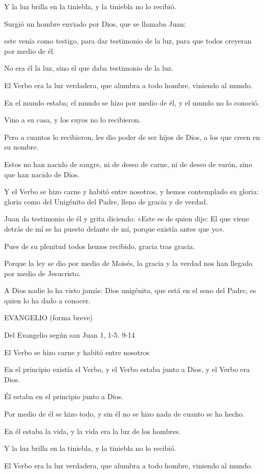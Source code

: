 \begin{body}
\begin{body}
Y la luz brilla en la tiniebla, y la tiniebla no lo recibió.

Surgió un hombre enviado por Dios, que se llamaba Juan:

este venía como testigo, para dar testimonio de la luz, para que todos
creyeran por medio de él.

No era él la luz, sino el que daba testimonio de la luz.

El Verbo era la luz verdadera, que alumbra a todo hombre, viniendo al
mundo.

En el mundo estaba; el mundo se hizo por medio de él, y el mundo no lo
conoció.

Vino a su casa, y los suyos no lo recibieron.

Pero a cuantos lo recibieron, les dio poder de ser hijos de Dios, a los
que creen en su nombre.

Estos no han nacido de sangre, ni de deseo de carne, ni de deseo de
varón, sino que han nacido de Dios.

Y el Verbo se hizo carne y habitó entre nosotros, y hemos contemplado su
gloria: gloria como del Unigénito del Padre, lleno de gracia y de
verdad.

Juan da testimonio de él y grita diciendo: «Este es de quien dije: El
que viene detrás de mí se ha puesto delante de mí, porque existía antes
que yo».

Pues de su plenitud todos hemos recibido, gracia tras gracia.

Porque la ley se dio por medio de Moisés, la gracia y la verdad nos han
llegado por medio de Jesucristo.

A Dios nadie lo ha visto jamás: Dios unigénito, que está en el seno del
Padre, es quien lo ha dado a conocer.

EVANGELIO (forma breve)

Del Evangelio según san Juan 1, 1-5. 9-14

El Verbo se hizo carne y habitó entre nosotros

En el principio existía el Verbo, y el Verbo estaba junto a Dios, y el
Verbo era Dios.

Él estaba en el principio junto a Dios.

Por medio de él se hizo todo, y sin él no se hizo nada de cuanto se ha
hecho.

En él estaba la vida, y la vida era la luz de los hombres.

Y la luz brilla en la tiniebla, y la tiniebla no lo recibió.

El Verbo era la luz verdadera, que alumbra a todo hombre, viniendo al
mundo.


\end{body}
\end{body}
